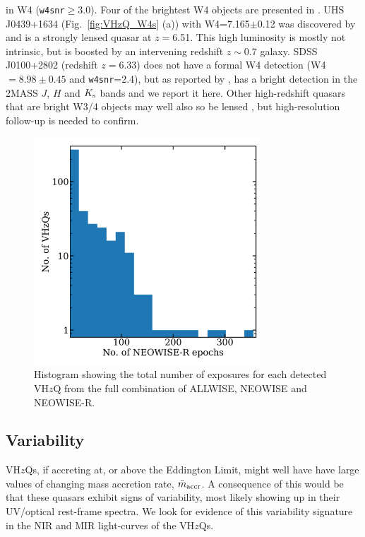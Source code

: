 \documentclass[usenatbib]{mnras}
\begin{document}
in W4 ({\tt w4snr}$\geq$3.0). Four of the brightest W4 objects are
presented in \label{fig:VHzQ_W4s}. UHS J0439+1634
(Fig.~\ref{fig:VHzQ_W4s} (a)) with W4=7.165$\pm$0.12 was discovered by
\citet{Fan2019} and is a strongly lensed quasar at $z=$6.51. This high
luminosity is mostly not intrinsic, but is boosted by an intervening
redshift $z\sim$0.7 galaxy. SDSS J0100+2802 (redshift $z=6.33$) does
not have a formal W4 detection (W4 $=8.98\pm0.45$ and {\tt w4snr}=2.4),
but as reported by \citet{Wu2015}, has a bright detection in the
2MASS $J$, $H$ and $K_{\rm s}$ bands and we report it here.
Other high-redshift quasars that are bright W3/4 objects may well 
also so be lensed \citep[e.g.,][]{Glikman2018lens, Fan2019}, 
but high-resolution follow-up is needed to confirm. 

\begin{figure}
  \centering
  \includegraphics[width=8.5cm]
  {../light_curves/MIR_LCs/NEOWISER_LC_histogramlog_20180827.png}
  \vspace{-16pt}
  \caption[]
  {Histogram showing the total number of exposures for each detected VH$z$Q
    from the full combination of ALLWISE, NEOWISE and NEOWISE-R.} 
  \label{fig:MIR_LC_epochs}
\end{figure}
\subsection{Variability}
VH$z$Qs, if accreting at, or above the Eddington Limit, might well have have large values of changing mass accretion rate, $\ddot{m}_{\rm accr}$. A consequence of this would be that these quasars exhibit signs of variability, most likely showing up in their UV/optical rest-frame spectra. We look for evidence of this variability signature in the NIR and MIR light-curves of the VH$z$Qs. 
\end{document}
